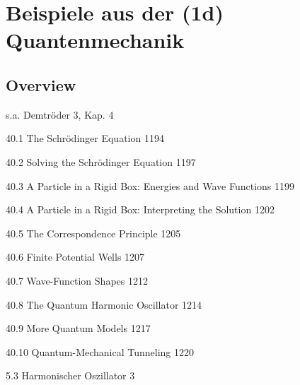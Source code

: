 \renewcommand{\lastmod}{10. September 2024}
\renewcommand{\chapterauthors}{Markus Lippitz}

\chapter{Beispiele aus der (1d) Quantenmechanik}






\section{Overview}

s.a. Demtröder 3, Kap. 4


40.1 The Schrödinger Equation 1194

40.2 Solving the Schrödinger Equation 1197

40.3 A Particle in a Rigid Box: Energies and Wave Functions 1199

40.4 A Particle in a Rigid Box: Interpreting the Solution 1202

40.5 The Correspondence Principle 1205


40.6 Finite Potential Wells 1207

40.7 Wave-Function Shapes 1212

40.8 The Quantum Harmonic Oscillator 1214

40.9 More Quantum Models 1217

40.10 Quantum-Mechanical Tunneling 1220


5.3 Harmonischer Oszillator 3	



